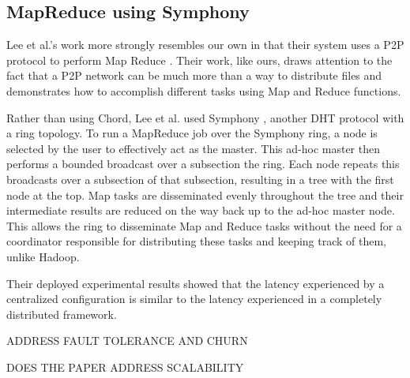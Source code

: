 \documentclass[10pt, conference, compsocconf]{IEEEtran}
\begin{document}

\subsection{MapReduce using Symphony}


Lee et al.'s work more strongly resembles our own in that their system uses a P2P protocol to perform Map Reduce \cite{leemap}.  Their work, like ours, draws attention to the fact that a P2P network can be much more than a way to distribute files and demonstrates how to accomplish different tasks using Map and Reduce functions.

Rather than using Chord, Lee et al. used Symphony \cite{symphony}, another DHT protocol with a ring topology.  To run a MapReduce job over the Symphony ring, a node is selected by the user to effectively act as the master.  This ad-hoc master then performs a bounded broadcast over a subsection the ring.  Each node repeats this broadcasts over a subsection of that subsection, resulting in a tree with the first node at the top.  Map tasks are disseminated evenly throughout the tree and their intermediate results are reduced on the way back up to the ad-hoc master node.  This allows the ring to disseminate Map and Reduce tasks without the need for a coordinator responsible for distributing these tasks and keeping track of them, unlike Hadoop.
 

Their deployed experimental results showed that the latency experienced by a centralized configuration is similar to the latency experienced in a completely distributed framework.

ADDRESS FAULT TOLERANCE AND CHURN

DOES THE PAPER ADDRESS SCALABILITY
\end{document}
